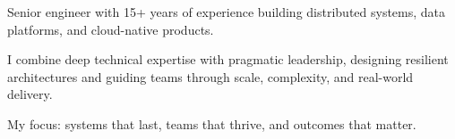 

\begin{cvparagraph}


Senior engineer with 15+ years of experience building distributed systems, data platforms, and cloud-native products.

I combine deep technical expertise with pragmatic leadership, designing resilient architectures and guiding teams through scale, complexity, and real-world delivery.

My focus: systems that last, teams that thrive, and outcomes that matter.
\end{cvparagraph}
